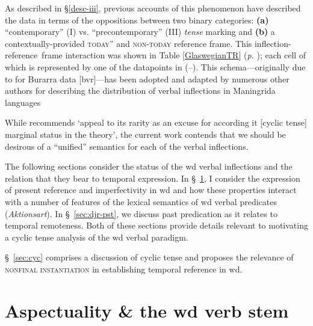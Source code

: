 As described in \S \ref{desc-iii}, previous accounts of this phenomenon have described the data in terms of the oppositions between two binary categories: \textbf{(a)} ``contemporary'' (\gls{I}) vs. ``precontemporary'' (\gls{III}) \textit{tense} marking and \textbf{(b)} a contextually-provided \textsc{today}'' and \textsc{non-today} reference frame. This inflection-reference~frame interaction was shown in Table  \ref{GlaswegianTR} (\textit{p.} \pageref{GlaswegianTR}); each cell of which is represented by one of the datapoints in (--). This schema---originally due to  \citet{Glasgow1964} for Burarra data [\gls{bvr}]---has been adopted and adapted by numerous other authors for describing the distribution of verbal inflections in Maningrida languages \citetext{see \citep{Eather2011,Green1987,Green1995} for Nakkara [\gls{nck}], Burarra [\gls{bvr}] and Gurrgoni [\gls{gge}] respectively.}


While \citet[89]{Comrie1985} recommends `appeal to its rarity as an excuse for according it [cyclic tense] marginal status in the theory', the current work contends that we should be desirous of a ``unified'' semantics for each of the verbal inflections.


The following sections consider the status of the \gls{wd} verbal inflections and the relation that they bear to temporal expression. In \S~\ref{sec:djr-prs}, I consider the expression of present reference and imperfectivity in \gls{wd} and how these properties interact with a number of features of the lexical semantics of \gls{wd} verbal predicates (\textit{Aktionsart}). In \S~\ref{sec:djr-pst}, we discuss past predication as it relates to temporal remoteness. Both of these sections provide details relevant to motivating a cyclic tense analysis of the \gls{wd} verbal paradigm.

 \S~\ref{sec:cyc} comprises a discussion of cyclic tense and proposes the relevance of \textsc{nonfinal instantiation} in establishing temporal reference in \gls{wd}.



\section{Aspectuality \& the \gls{wd} verb stem}%
\label{sec:djr-prs}




